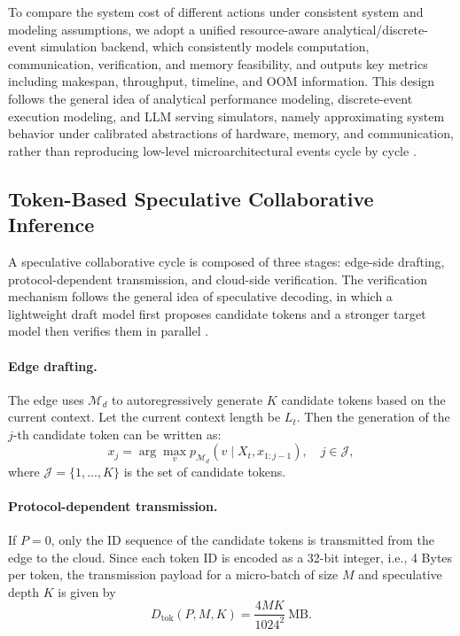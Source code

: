 \documentclass[a4paper,fleqn]{cas-dc}
\begin{document}
To compare the system cost of different actions under consistent system and modeling assumptions, we adopt a unified resource-aware analytical/discrete-event simulation backend, which consistently models computation, communication, verification, and memory feasibility, and outputs key metrics including makespan, throughput, timeline, and OOM information. This design follows the general idea of analytical performance modeling, discrete-event execution modeling, and LLM serving simulators, namely approximating system behavior under calibrated abstractions of hardware, memory, and communication, rather than reproducing low-level microarchitectural events cycle by cycle \cite{williams2009roofline,agrawal2024vidur,cho2025llmservingsim2,qin2026phantora}.

\subsection{Token-Based Speculative Collaborative Inference}

A speculative collaborative cycle is composed of three stages: edge-side drafting, protocol-dependent transmission, and cloud-side verification. The verification mechanism follows the general idea of speculative decoding, in which a lightweight draft model first proposes candidate tokens and a stronger target model then verifies them in parallel \cite{leviathan2023speculative,li2024eagle,miao2024specinfer}.

\paragraph{Edge drafting.}
The edge uses $\mathcal{M}_d$ to autoregressively generate $K$ candidate tokens based on the current context. Let the current context length be $L_t$. Then the generation of the $j$-th candidate token can be written as:
\begin{equation}
x_j = \arg\max_{v} p_{\mathcal{M}_d}(v \mid X_t, x_{1:j-1}), \quad j\in\mathcal{J},
\end{equation}
where $\mathcal{J}=\{1,\dots,K\}$ is the set of candidate tokens.

\paragraph{Protocol-dependent transmission.}
If $P = 0$, only the ID sequence of the candidate tokens is transmitted from the edge to the cloud. Since each token ID is encoded as a 32-bit integer, i.e., 4 Bytes per token, the transmission payload for a micro-batch of size $M$ and speculative depth $K$ is given by
\begin{equation}
D_{\text{tok}}(P,M,K) = \frac{4MK}{1024^2}\ \text{MB}.
\end{equation}
\end{document}
